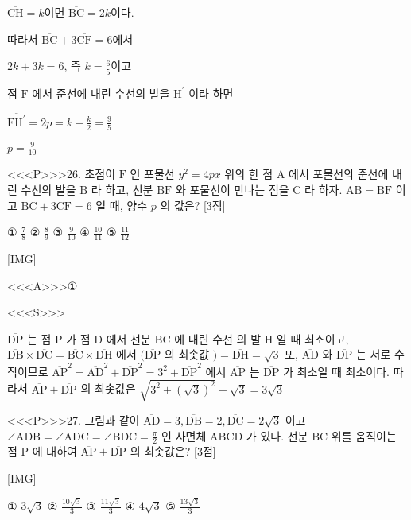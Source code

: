 \documentclass{oblivoir}
\begin{document}
$\overline{\mathrm{CH}}=k$이면 $\overline{\mathrm{BC}}=2 k$이다.

따라서 $\overline{\mathrm{BC}}+3 \overline{\mathrm{CF}}=6$에서

$2 k+3 k=6$, 즉 $k=\frac{6}{5}$이고

점 $\mathrm{F}$ 에서 준선에 내린 수선의 발을 $\mathrm{H}^{\prime}$ 이라 하면

$\overline{\mathrm{FH}^{\prime}}=2 p=k+\frac{k}{2}=\frac{9}{5}$

$p=\frac{9}{10}$


<<<P>>>26. 초점이 $\mathrm{F}$ 인 포물선 $y^{2}=4 p x$ 위의 한 점 $\mathrm{A}$ 에서 포물선의 준선에 내린 수선의 발을 $\mathrm{B}$ 라 하고, 선분 $\mathrm{BF}$ 와 포물선이 만나는 점을 $\mathrm{C}$ 라 하자. $\overline{\mathrm{AB}}=\overline{\mathrm{BF}}$ 이고 $\overline{\mathrm{BC}}+3 \overline{\mathrm{CF}}=6$ 일 때, 양수 $p$ 의 값은? [3점]

① $\frac{7}{8}$
② $\frac{8}{9}$
③ $\frac{9}{10}$
④ $\frac{10}{11}$
⑤ $\frac{11}{12}$


[IMG]


<<<A>>>①

<<<S>>>



$ \overline{\mathrm{DP}}$ 는 점 $\mathrm{P}$ 가 점 $\mathrm{D}$ 에서 선분 $\mathrm{BC}$ 에 내린 수선 의 발 $\mathrm{H}$ 일 때 최소이고, $\overline{\mathrm{DB}} \times \overline{\mathrm{DC}}=\overline{\mathrm{BC}} \times \overline{\mathrm{DH}}$ 에서 $(\overline{\mathrm{DP}}$ 의 최솟값 $)=\overline{\mathrm{DH}}=\sqrt{3}$
또, $\overline{\mathrm{AD}}$ 와 $\overline{\mathrm{DP}}$ 는 서로 수직이므로 $\overline{\mathrm{AP}}^{2}=\overline{\mathrm{AD}}^{2}+\overline{\mathrm{DP}}^{2}=3^{2}+\overline{\mathrm{DP}}^{2}$ 에서 $\overline{\mathrm{AP}}$ 는 $\overline{\mathrm{DP}}$ 가 최소일 때 최소이다. 따라서 $\overline{\mathrm{AP}}+\overline{\mathrm{DP}}$ 의 최솟값은 $\sqrt{3^{2}+(\sqrt{3})^{2}}+\sqrt{3}=3 \sqrt{3}$


<<<P>>>27. 그림과 같이 $\overline{\mathrm{AD}}=3, \overline{\mathrm{DB}}=2, \overline{\mathrm{DC}}=2 \sqrt{3}$ 이고 $\angle \mathrm{ADB}=\angle \mathrm{ADC}=\angle \mathrm{BDC}=\frac{\pi}{2}$ 인 사면체 $\mathrm{ABCD}$ 가 있다. 선분 $\mathrm{BC}$ 위를 움직이는 점 $\mathrm{P}$ 에 대하여 $\overline{\mathrm{AP}}+\overline{\mathrm{DP}}$ 의 최솟값은? [3점]


[IMG]

① $3 \sqrt{3}$
② $\frac{10 \sqrt{3}}{3}$
③ $\frac{11 \sqrt{3}}{3}$
④ $4 \sqrt{3}$
⑤ $\frac{13 \sqrt{3}}{3}$
\end{document}
